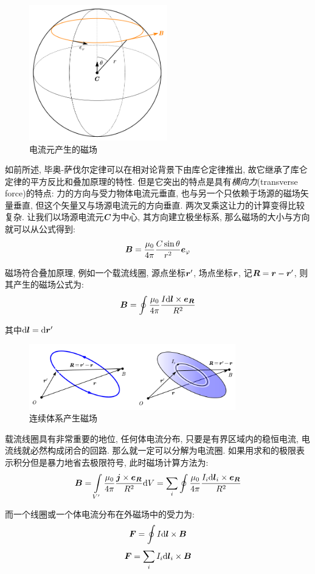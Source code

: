 \begin{figure}
\centering
\includegraphics[width=6cm]{image/7-4-6.png}
\caption{电流元产生的磁场}
\end{figure}
如前所述, 毕奥-萨伐尔定律可以在相对论背景下由库仑定律推出, 故它继承了库仑定律的平方反比和叠加原理的特性. 但是它突出的特点是具有\emph{横向力}(transverse force)的特点: 力的方向与受力物体电流元垂直, 也与另一个只依赖于场源的磁场矢量垂直, 但这个矢量又与场源电流元的方向垂直. 两次叉乘这让力的计算变得比较复杂. 让我们以场源电流元$\boldsymbol{C}$为中心, 其方向建立极坐标系, 那么磁场的大小与方向就可以从公式得到:
\[\boldsymbol{B}=\frac{\mu_0}{4\pi}\frac{C\sin\theta}{r^2}\boldsymbol{e}_\varphi \]

磁场符合叠加原理, 例如一个载流线圈, 源点坐标$\boldsymbol{r}'$, 场点坐标$\boldsymbol{r}$, 记$\boldsymbol{R}=\boldsymbol{r}-\boldsymbol{r}'$, 则其产生的磁场公式为:
\[\boldsymbol{B}=\oint \frac{\mu_0}{4\pi}\frac{I\textrm{d} \boldsymbol{l}\times \boldsymbol{e}_{\boldsymbol{R}}}{R^2}\]

其中$\textrm{d} \boldsymbol{l}=\textrm{d} \boldsymbol{r}'$

\begin{figure}[H]
\centering
\includegraphics[width=0.8\textwidth]{image/7-4-7.png}
\caption{连续体系产生磁场}
\end{figure}

载流线圈具有非常重要的地位, 任何体电流分布, 只要是有界区域内的稳恒电流, 电流线就必然构成闭合的回路. 那么就一定可以分解为电流圈. 如果用求和的极限表示积分但是暴力地省去极限符号, 此时磁场计算方法为:
\[\boldsymbol{B}=\int\limits_{V'} \frac{\mu_0}{4\pi}\frac{\boldsymbol{j}\times \boldsymbol{e}_{\boldsymbol{R}}}{R^2}\textrm{d} V=\sum_i \oint \frac{\mu_0}{4\pi}\frac{I_i\textrm{d} \boldsymbol{l}_i\times \boldsymbol{e}_{\boldsymbol{R}}}{R^2}\]

而一个线圈或一个体电流分布在外磁场中的受力为:
\[\boldsymbol{F}=\oint I\textrm{d}\boldsymbol{l}\times \boldsymbol{B}\]
\[\boldsymbol{F}=\sum_i I_i\textrm{d}\boldsymbol{l}_i\times \boldsymbol{B}\]

